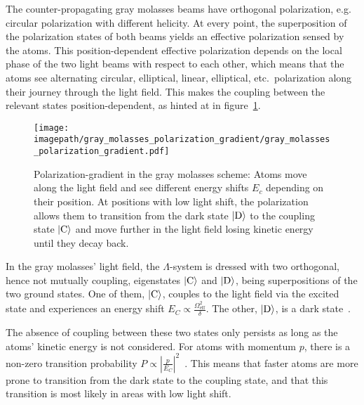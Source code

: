 The counter-propagating gray molasses beams have orthogonal polarization, e.g. circular polarization with different helicity. At every point, the superposition of the polarization states of both beams yields an effective polarization sensed by the atoms. This position-dependent effective polarization depends on the local phase of the two light beams with respect to each other, which means that the atoms see alternating circular, elliptical, linear, elliptical, etc.~polarization along their journey through the light field. This makes the coupling between the relevant states position-dependent, as hinted at in figure~\ref{fig:gray_molasses_polarization_gradient}.

\begin{figure}
    \centering
    \texttt{[image: \\imagepath/gray\_molasses\_polarization\_gradient/gray\_molasses\_polarization\_gradient.pdf]}
    \caption{Polarization-gradient in the gray molasses scheme: Atoms move along the light field and see different energy shifts $E_c$ depending on their position. At positions with low light shift, the polarization allows them to transition from the dark state $\Ket{\text{D}}$ to the coupling state $\Ket{\text{C}}$ and move further in the light field losing kinetic energy until they decay back.}
    \label{fig:gray_molasses_polarization_gradient}
\end{figure}

In the gray molasses' light field, the $\Lambda$-system is dressed with two orthogonal, hence not mutually coupling, eigenstates $\Ket{\text{C}}$ and $\Ket{\text{D}}$, being superpositions of the two ground states. One of them, $\Ket{\text{C}}$, couples to the light field via the excited state and experiences an energy shift $E_C \propto \frac{\Omega_\text{eff}^2}{\delta}$. The other, $\Ket{\text{D}}$, is a dark state~\cite{weidemuller_novel_1994,gerken_gray_2016}.

The absence of coupling between these two states only persists as long as the atoms' kinetic energy is not considered. For atoms with momentum $p$, there is a non-zero transition probability $P \propto \left|\frac{p}{E_C} \right|^2$~\cite{weidemuller_novel_1994}. This means that faster atoms are more prone to transition from the dark state to the coupling state, and that this transition is most likely in areas with low light shift.

